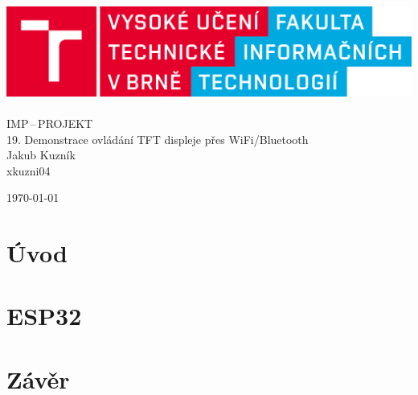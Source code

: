 \documentclass[a4paper, 11pt]{article}
\begin{document}
\begin{titlepage}
    \begin{center}
        \includegraphics[scale=0.15]{fit_logo.png}\\
         \\
        \huge IMP\,--\,PROJEKT\\
\hfill \break
        \large 19. Demonstrace ovládání TFT displeje přes WiFi/Bluetooth\\
\hfill \break
        \normalsize Jakub Kuzník \\
        xkuzni04
        
        {\Large\noindent \today }
    \end{center}
    
    

\end{titlepage}

{\hypersetup{hidelinks}\tableofcontents}
\clearpage



\section{Úvod}


\section{ESP32}


\section{Závěr}


\newpage


\clearpage
\end{document}
